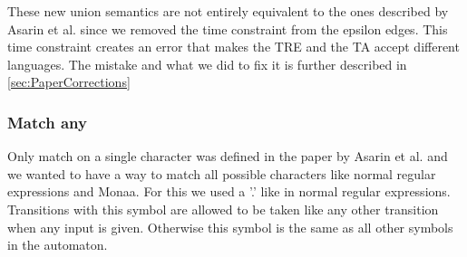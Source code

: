 

These new union semantics are not entirely equivalent to the ones described by Asarin et al. since we removed the time constraint from the epsilon edges.
This time constraint creates an error that makes the TRE and the TA accept different languages.
The mistake and what we did to fix it is further described in \cref{sec:PaperCorrections}

\subsubsection{Match any}
Only match on a single character was defined in the paper by Asarin et al. and we wanted to have a way to match all possible characters like normal regular expressions and Monaa. For this we used a '.' like in normal regular expressions. Transitions with this symbol are allowed to be taken like any other transition when any input is given. Otherwise this symbol is the same as all other symbols in the automaton.


